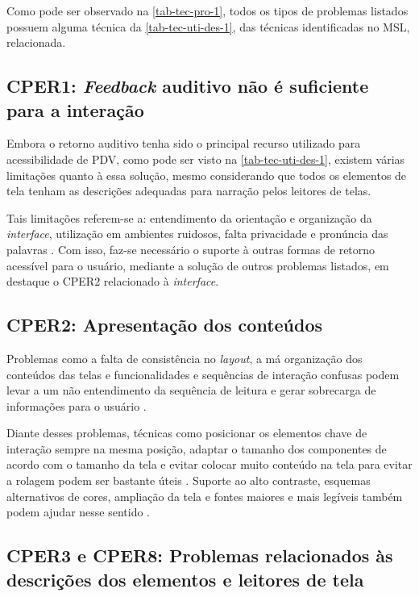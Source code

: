 \newpage

Como pode ser observado na \autoref{tab-tec-pro-1}, todos os tipos de problemas listados possuem alguma
técnica da \autoref{tab-tec-uti-des-1}, das técnicas identificadas no MSL, relacionada.

\subsection{CPER1: \emph{Feedback} auditivo não é suficiente para a interação}

Embora o retorno auditivo tenha sido o principal recurso utilizado para acessibilidade de PDV, como pode
ser visto na \autoref{tab-tec-uti-des-1}, existem várias limitações quanto à essa solução, mesmo considerando
que todos os elementos de tela tenham as descrições adequadas para narração pelos leitores de
telas.

Tais limitações referem-se a: entendimento da orientação e organização da \emph{interface}, utilização
em ambientes ruidosos, falta privacidade e pronúncia das palavras \cite{Damaceno2016}.
Com isso, faz-se necessário o suporte à outras formas de retorno acessível para o usuário, mediante a solução de outros problemas
listados, em destaque o CPER2 relacionado à \emph{interface}.

\subsection{CPER2: Apresentação dos conteúdos}

Problemas como a falta de consistência no \emph{layout}, a má organização dos conteúdos das telas e
funcionalidades e sequências de interação confusas podem levar a um não entendimento
da sequência de leitura e gerar sobrecarga de informações para o usuário \cite{Shera2021285, Christoph2020}.

Diante desses problemas, técnicas como posicionar os elementos chave de interação sempre na mesma posição,
adaptar o tamanho dos componentes de acordo com o tamanho da tela e evitar colocar muito conteúdo na tela para evitar
a rolagem podem ser bastante úteis \cite{Mascetti2019,Ducci2018}. Suporte ao alto contraste,
esquemas alternativos de cores, ampliação da tela e fontes maiores e mais legíveis também podem ajudar nesse sentido
\cite{Kim20191103,Oliveira2019}.

\subsection{CPER3 e CPER8: Problemas relacionados às descrições dos elementos e leitores de tela}

